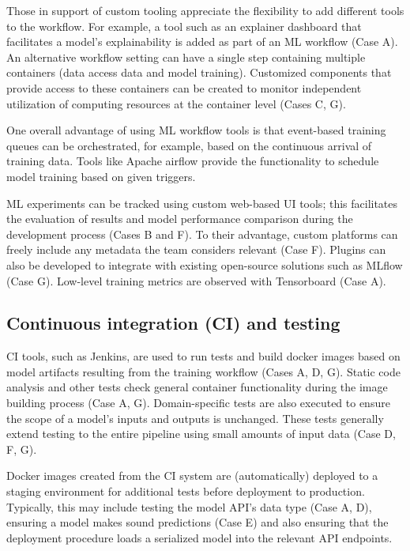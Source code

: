 Those in support of custom tooling appreciate the flexibility to add different tools to the workflow. For example, a tool such as an explainer dashboard that facilitates a model's explainability is added as part of an ML workflow (Case A). An alternative workflow setting can have a single step containing multiple containers (data access data and model training). Customized components that provide access to these containers can be created to monitor independent utilization of computing resources at the container level (Cases C, G).

One overall advantage of using ML workflow tools is that event-based training queues can be orchestrated, for example, based on the continuous arrival of training data.  Tools like Apache airflow provide the functionality to schedule model training based on given triggers.

ML experiments can be tracked using custom web-based UI tools; this facilitates the evaluation of results and model performance comparison during the development process (Cases B and F). To their advantage, custom platforms can freely include any metadata the team considers relevant (Case F). Plugins can also be developed to integrate with existing open-source solutions such as MLflow (Case G). Low-level training metrics are observed with Tensorboard (Case A).



\subsection{Continuous integration (CI) and testing}

CI tools, such as Jenkins, are used to run tests and build docker images based on model artifacts resulting from the training workflow (Cases A, D, G). Static code analysis and other tests check general container functionality during the image building process (Case A, G). Domain-specific tests are also executed to ensure the scope of a model's inputs and outputs is unchanged. These tests generally extend testing to the entire pipeline using small amounts of input data (Case D, F, G). 

Docker images created from the CI system are (automatically) deployed to a staging environment for additional tests before deployment to production. Typically, this may include testing the model API's data type (Case A, D), ensuring a model makes sound predictions (Case E) and also ensuring that the deployment procedure loads a serialized model into the relevant API endpoints.

